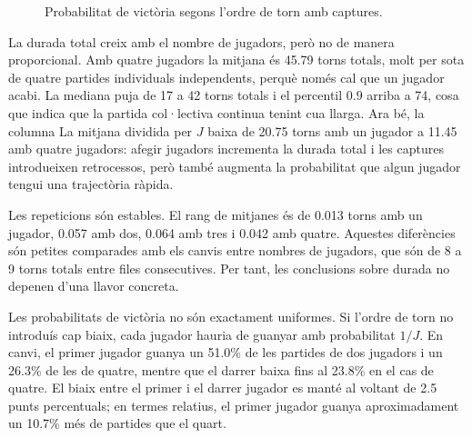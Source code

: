 \documentclass[conference,compsoc]{IEEEtran}
\begin{document}
\begin{figure}[H]
\centering
{}
\caption{Probabilitat de victòria segons l'ordre de torn amb captures.}
\label{fig:victories}
\end{figure}

La durada total creix amb el nombre de jugadors, però no de manera proporcional. Amb
quatre jugadors la mitjana és 45.79 torns totals, molt per sota de quatre partides
individuals independents, perquè només cal que un jugador acabi. La mediana puja de
17 a 42 torns totals i el percentil $0.9$ arriba a 74, cosa que indica que la
partida col·lectiva continua tenint cua llarga. Ara bé, la columna
La mitjana dividida per $J$ baixa de 20.75 torns amb un jugador a 11.45 amb quatre jugadors:
afegir jugadors incrementa la durada total i les captures introdueixen retrocessos,
però també augmenta la probabilitat que algun jugador tengui una trajectòria ràpida.

Les repeticions són estables. El rang de mitjanes és de 0.013 torns amb un jugador,
0.057 amb dos, 0.064 amb tres i 0.042 amb quatre. Aquestes diferències són petites
comparades amb els canvis entre nombres de jugadors, que són de 8 a 9 torns totals
entre files consecutives. Per tant, les conclusions sobre durada no depenen d'una
llavor concreta.

Les probabilitats de victòria no són exactament uniformes. Si l'ordre de torn no
introduís cap biaix, cada jugador hauria de guanyar amb probabilitat $1/J$. En
canvi, el primer jugador guanya un 51.0\% de les partides de dos jugadors i un
26.3\% de les de quatre, mentre que el darrer baixa fins al 23.8\% en el cas de
quatre. El biaix entre el primer i el darrer jugador es manté al voltant de 2.5
punts percentuals; en termes relatius, el primer jugador guanya aproximadament un
10.7\% més de partides que el quart.
\end{document}
